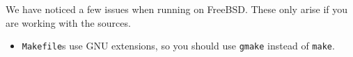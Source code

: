 
We have noticed a few issues when running {\mlton} on FreeBSD.  These
only arise if you are working with the {\mlton} sources.

\begin{itemize}


\item {\mlton} {\tt Makefile}s use GNU extensions, so you should use {\tt gmake}
instead of {\tt make}.

\end{itemize}
